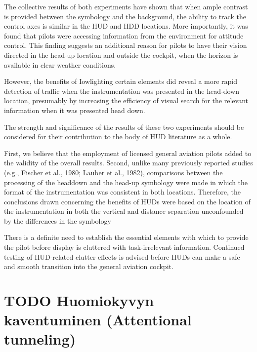 \documentclass[utf8,bachelor,manualbib]{gradu3}
\begin{document}
The collective results of both experiments have shown that when ample contrast is
provided between the symbology and the background, the ability to track the control
axes is similar in the HUD and HDD locations. More importantly, it was found that
pilots were accessing information from the environment for attitude control. This
finding suggests an additional reason for pilots to have their vision directed in the
head-up location and outside the cockpit, when the horizon is available in clear
weather conditions.




However, the benefits of Iowlighting certain elements did reveal a more rapid
detection of traffic when the instrumentation was presented in the head-down
location, presumably by increasing the efficiency of visual search for the relevant
information when it was presented head down.

The strength and significance of the results of these two experiments should be
considered for their contribution to the body of HUD literature as a whole. 

First, we believe that the employment of licensed general aviation pilots added to the validity of the overall results. Second, unlike many previously reported studies (e.g., Fischer et al., 1980; Lauber et al., 1982), comparisons between the processing of the headdown and the head-up symbology were made in which the format of the instrumentation was consistent in both locations. Therefore, the conclusions drawn concerning the benefits of HUDs were based on the location of the instrumentation in both the vertical and distance separation unconfounded by the differences in the symbology

There is a definite need to
establish the essential elements with which to provide the pilot before display is
cluttered with task-irrelevant information. Continued testing of HUD-related clutter effects is advised before HUDs can make a safe and smooth transition into the general aviation cockpit. \citep{ververs1998}






















\section{TODO Huomiokyvyn kaventuminen (Attentional tunneling)}
\end{document}
